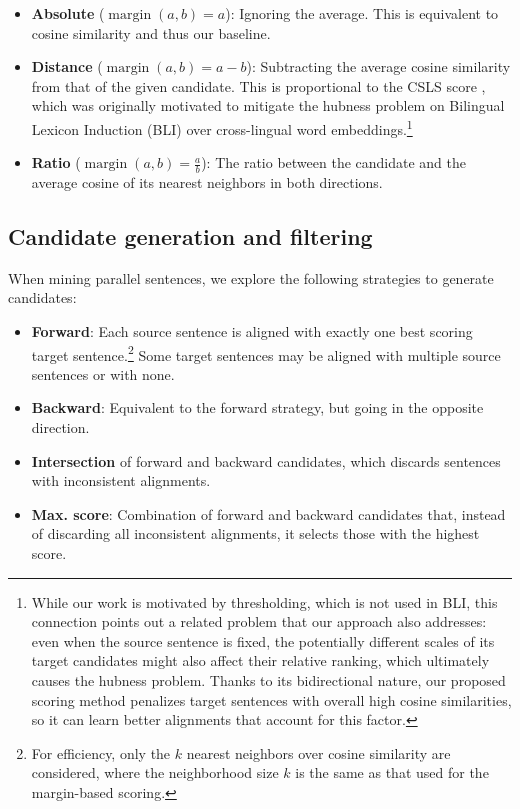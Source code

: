\documentclass[11pt,a4paper]{article}
\DeclareMathOperator{\margin}{margin}
\begin{document}
\begin{itemize}
    \item \textbf{Absolute} ($\margin(a, b) = a$): Ignoring the average. This is equivalent to cosine similarity and thus our baseline.
    \item \textbf{Distance} ($\margin(a, b) = a - b$): Subtracting the average cosine similarity from that of the given candidate. This is proportional to the CSLS score \citep{conneau2018word}, which was originally motivated to mitigate the hubness problem on Bilingual Lexicon Induction (BLI) over cross-lingual word embeddings.\footnote{While our work is motivated by thresholding, which is not used in BLI, this connection points out a related problem that our approach also addresses: even when the source sentence is fixed, the potentially different scales of its target candidates might also affect their relative ranking, which ultimately causes the hubness problem. Thanks to its bidirectional nature, our proposed scoring method penalizes target sentences with overall high cosine similarities, so it can learn better alignments that account for this factor.}
    \item \textbf{Ratio} ($\margin(a, b) = \frac{a}{b}$): The ratio between the candidate and the average cosine of its nearest neighbors in both directions.
\end{itemize}




\subsection{Candidate generation and filtering} \label{subsec:filtering}

When mining parallel sentences, we explore the following strategies to generate candidates:
\begin{itemize}
    \item \textbf{Forward}: Each source sentence is aligned with exactly one best scoring target sentence.\footnote{For efficiency, only the $k$ nearest neighbors over cosine similarity are considered, where the neighborhood size $k$ is the same as that used for the margin-based scoring.} Some target sentences may be aligned with multiple source sentences or with none.
    \item \textbf{Backward}: Equivalent to the forward strategy, but going in the opposite direction.
    \item \textbf{Intersection} of forward and backward candidates, which discards sentences with inconsistent alignments.
    \item \textbf{Max. score}: Combination of forward and backward candidates that, instead of discarding all inconsistent alignments, it selects those with the highest score.
\end{itemize}
\end{document}
